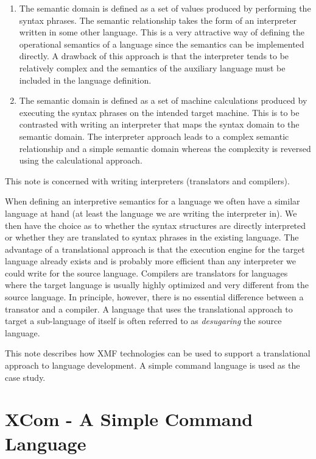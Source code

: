 \documentclass{article}
\begin{document}
\begin{enumerate}

\item The semantic domain is defined as a set of values produced by 
performing the syntax phrases. The semantic relationship takes the form of
an interpreter written in some other language. This is a very attractive
way of defining the operational semantics of a language since the
semantics can be implemented directly. A drawback of this approach is that 
the interpreter tends to be relatively complex and the semantics of the
auxiliary language must be included in the language definition.

\item The semantic domain is defined as a set of machine calculations
produced by executing the syntax phrases on the intended target machine.
This is to be contrasted with writing an interpreter that maps the
syntax domain to the semantic domain. The interpreter approach leads to 
a complex semantic relationship and a simple semantic domain whereas the
complexity is reversed using the calculational approach.

\end{enumerate}
This note is concerned with writing interpreters (translators and compilers).

When defining an interpretive semantics for a language we often have a
similar language at hand (at least the language we are writing the interpreter 
in). We then have the choice as to whether the syntax structures are
directly interpreted or whether they are translated to syntax phrases in the
existing language. The advantage of a translational approach is that the
execution engine for the target language already exists and is probably
more efficient than any interpreter we could write for the source language.
Compilers are translators for languages where the target language is usually
highly optimized and very different from the source language. In principle,
however, there is no essential difference between a transator and a compiler.
A language that uses the translational approach to target a sub-language
of itself is often referred to as {\em desugaring} the source language.

This note describes how XMF technologies can be used to support a translational
approach to language development. A simple command language is used as the
case study.

\section{XCom - A Simple Command Language}
\end{document}
